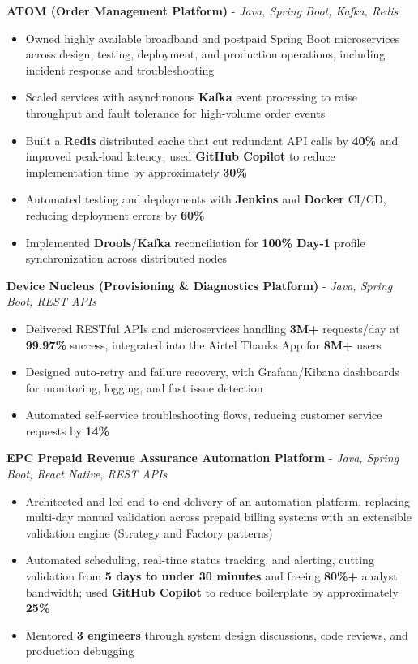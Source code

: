 \documentclass[letterpaper,11pt]{article}
\newcommand{\resumeItem}[1]{
  \item\small{{#1 \vspace{-2pt}}}
}
\newcommand{\resumeItemListStart}{\begin{itemize}[itemsep=0pt,topsep=2pt,parsep=0pt]}
\newcommand{\resumeItemListEnd}{\end{itemize}\vspace{-5pt}}
\begin{document}
      \vspace{4pt}
      \textbf{\small ATOM (Order Management Platform)} - \textit{\small Java, Spring Boot, Kafka, Redis} \\
      \vspace{-2pt}
      \resumeItemListStart
        \resumeItem{Owned highly available broadband and postpaid Spring Boot microservices across design, testing, deployment, and production operations, including incident response and troubleshooting}
        \resumeItem{Scaled services with asynchronous \textbf{Kafka} event processing to raise throughput and fault tolerance for high-volume order events}
        \resumeItem{Built a \textbf{Redis} distributed cache that cut redundant API calls by \textbf{40\%} and improved peak-load latency; used \textbf{GitHub Copilot} to reduce implementation time by approximately \textbf{30\%}}
        \resumeItem{Automated testing and deployments with \textbf{Jenkins} and \textbf{Docker} CI/CD, reducing deployment errors by \textbf{60\%}}
        \resumeItem{Implemented \textbf{Drools}/\textbf{Kafka} reconciliation for \textbf{100\% Day-1} profile synchronization across distributed nodes}
      \resumeItemListEnd

      \vspace{2pt}
      \textbf{\small Device Nucleus (Provisioning \& Diagnostics Platform)} - \textit{\small Java, Spring Boot, REST APIs} \\
      \vspace{-2pt}
      \resumeItemListStart
        \resumeItem{Delivered RESTful APIs and microservices handling \textbf{3M+} requests/day at \textbf{99.97\%} success, integrated into the Airtel Thanks App for \textbf{8M+} users}
        \resumeItem{Designed auto-retry and failure recovery, with Grafana/Kibana dashboards for monitoring, logging, and fast issue detection}
        \resumeItem{Automated self-service troubleshooting flows, reducing customer service requests by \textbf{14\%}}
      \resumeItemListEnd

      \vspace{2pt}
      \textbf{\small EPC Prepaid Revenue Assurance Automation Platform} - \textit{\small Java, Spring Boot, React Native, REST APIs} \\
      \vspace{-2pt}
      \resumeItemListStart
        \resumeItem{Architected and led end-to-end delivery of an automation platform, replacing multi-day manual validation across prepaid billing systems with an extensible validation engine (Strategy and Factory patterns)}
        \resumeItem{Automated scheduling, real-time status tracking, and alerting, cutting validation from \textbf{5 days to under 30 minutes} and freeing \textbf{80\%+} analyst bandwidth; used \textbf{GitHub Copilot} to reduce boilerplate by approximately \textbf{25\%}}
        \resumeItem{Mentored \textbf{3 engineers} through system design discussions, code reviews, and production debugging}
      \resumeItemListEnd
\end{document}
